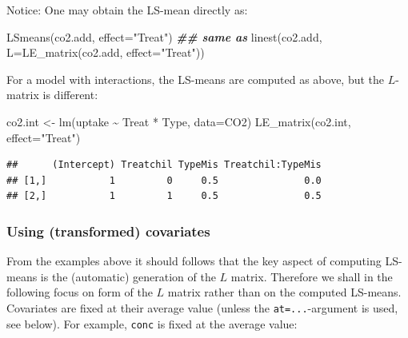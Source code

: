 \documentclass[
]{article}
\newenvironment{Shaded}{\begin{snugshade}}{\end{snugshade}}
\newcommand{\AttributeTok}[1]{\textcolor[rgb]{0.77,0.63,0.00}{#1}}
\newcommand{\DocumentationTok}[1]{\textcolor[rgb]{0.56,0.35,0.01}{\textbf{\textit{#1}}}}
\newcommand{\FunctionTok}[1]{\textcolor[rgb]{0.00,0.00,0.00}{#1}}
\newcommand{\NormalTok}[1]{#1}
\newcommand{\OtherTok}[1]{\textcolor[rgb]{0.56,0.35,0.01}{#1}}
\newcommand{\SpecialCharTok}[1]{\textcolor[rgb]{0.00,0.00,0.00}{#1}}
\newcommand{\StringTok}[1]{\textcolor[rgb]{0.31,0.60,0.02}{#1}}
\begin{document}
Notice: One may obtain the LS-mean directly as:

\begin{Shaded}
\begin{Highlighting}[]
\FunctionTok{LSmeans}\NormalTok{(co2.add, }\AttributeTok{effect=}\StringTok{"Treat"}\NormalTok{)}
\DocumentationTok{\#\# same as}
\FunctionTok{linest}\NormalTok{(co2.add, }\AttributeTok{L=}\FunctionTok{LE\_matrix}\NormalTok{(co2.add, }\AttributeTok{effect=}\StringTok{"Treat"}\NormalTok{))}
\end{Highlighting}
\end{Shaded}

For a model with interactions, the LS-means are computed as above, but
the \(L\)-matrix is different:

\begin{Shaded}
\begin{Highlighting}[]
\NormalTok{co2.int }\OtherTok{\textless{}{-}} \FunctionTok{lm}\NormalTok{(uptake }\SpecialCharTok{\textasciitilde{}}\NormalTok{ Treat }\SpecialCharTok{*}\NormalTok{ Type, }\AttributeTok{data=}\NormalTok{CO2)}
\FunctionTok{LE\_matrix}\NormalTok{(co2.int, }\AttributeTok{effect=}\StringTok{"Treat"}\NormalTok{)}
\end{Highlighting}
\end{Shaded}

\begin{verbatim}
##      (Intercept) Treatchil TypeMis Treatchil:TypeMis
## [1,]           1         0     0.5               0.0
## [2,]           1         1     0.5               0.5
\end{verbatim}

\hypertarget{using-transformed-covariates}{%
\subsubsection{Using (transformed)
covariates}\label{using-transformed-covariates}}

From the examples above it should follows that the key aspect of
computing LS-means is the (automatic) generation of the \(L\) matrix.
Therefore we shall in the following focus on form of the \(L\) matrix
rather than on the computed LS-means. Covariates are fixed at their
average value (unless the \texttt{at=...}-argument is used, see below).
For example, \texttt{conc} is fixed at the average value:

\begin{Shaded}
\end{Shaded}
\end{document}
